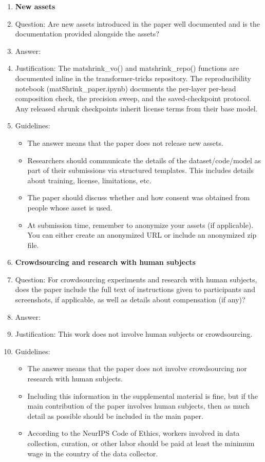 \begin{enumerate}
\item {\bf New assets}
    \item[] Question: Are new assets introduced in the paper well documented and is the documentation provided alongside the assets?
    \item[] Answer: \answerYes{} %
    \item[] Justification: The matshrink\_vo() and matshrink\_repo() functions are documented inline in the transformer-tricks repository. The reproducibility notebook (matShrink\_paper.ipynb) documents the per-layer per-head composition check, the precision sweep, and the saved-checkpoint protocol. Any released shrunk checkpoints inherit license terms from their base model.
    \item[] Guidelines:
    \begin{itemize}
        \item The answer \answerNA{} means that the paper does not release new assets.
        \item Researchers should communicate the details of the dataset\slash code\slash model as part of their submissions via structured templates. This includes details about training, license, limitations, etc.
        \item The paper should discuss whether and how consent was obtained from people whose asset is used.
        \item At submission time, remember to anonymize your assets (if applicable). You can either create an anonymized URL or include an anonymized zip file.
    \end{itemize}

\item {\bf Crowdsourcing and research with human subjects}
    \item[] Question: For crowdsourcing experiments and research with human subjects, does the paper include the full text of instructions given to participants and screenshots, if applicable, as well as details about compensation (if any)?
    \item[] Answer: \answerNA{} %
    \item[] Justification: This work does not involve human subjects or crowdsourcing.
    \item[] Guidelines:
    \begin{itemize}
        \item The answer \answerNA{} means that the paper does not involve crowdsourcing nor research with human subjects.
        \item Including this information in the supplemental material is fine, but if the main contribution of the paper involves human subjects, then as much detail as possible should be included in the main paper.
        \item According to the NeurIPS Code of Ethics, workers involved in data collection, curation, or other labor should be paid at least the minimum wage in the country of the data collector.
    \end{itemize}


\end{enumerate}
